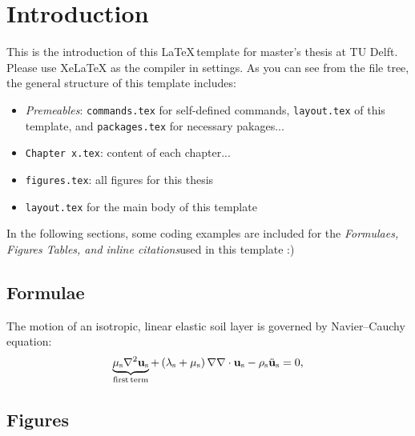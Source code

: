 \chapter{Introduction}
This is the introduction of this \LaTeX\,template for master's thesis at TU Delft. Please use XeLaTeX as the compiler in settings. As you can see from the file tree, the general structure of this template includes:
\begin{itemize}
    \item \textit{Premeables}: \texttt{commands.tex} for self-defined commands, \texttt{layout.tex} of this template, and \texttt{packages.tex} for necessary pakages...
    \item \texttt{Chapter x.tex}: content of each chapter...
    \item \texttt{figures.tex}: all figures for this thesis
    \item \texttt{layout.tex} for the main body of this template
\end{itemize}
In the following sections, some coding examples are included for the \textit{Formulaes, Figures Tables, and inline citations}used in this template :)
\clearpage
\section{Formulae}
The motion of an isotropic, linear elastic soil layer is governed by Navier--Cauchy equation:
\begin{align}
\underbrace{\mu_{\mathrm{s}}\nabla^2\mathbf{u}_{\mathrm{s}}}_{\text{first\,term}}+\left(\lambda_{\mathrm{s}}+\mu_{\mathrm{s}}\right)\nabla\nabla\cdot\mathbf{u}_{\mathrm{s}} - \rho_{\mathrm{s}}{\ddot{\mathbf{u}}}_{\mathrm{s}}=0,
\label{eq: Navier-Cauchy Equation}
\end{align}
\section{Figures}
